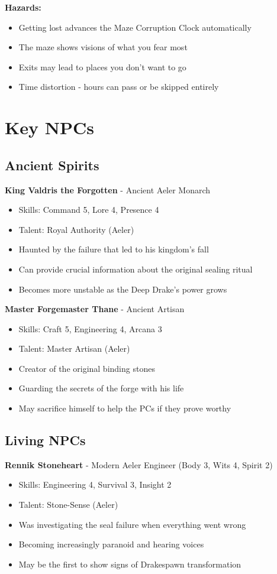 \documentclass[11pt]{article}
\begin{document}
\textbf{Hazards:}
\begin{itemize}
\item Getting lost advances the Maze Corruption Clock automatically
\item The maze shows visions of what you fear most
\item Exits may lead to places you don't want to go
\item Time distortion - hours can pass or be skipped entirely
\end{itemize}

\section{Key NPCs}

\subsection{Ancient Spirits}

\textbf{King Valdris the Forgotten} - Ancient Aeler Monarch
\begin{itemize}
\item Skills: Command 5, Lore 4, Presence 4
\item Talent: Royal Authority (Aeler)
\item Haunted by the failure that led to his kingdom's fall
\item Can provide crucial information about the original sealing ritual
\item Becomes more unstable as the Deep Drake's power grows
\end{itemize}

\textbf{Master Forgemaster Thane} - Ancient Artisan
\begin{itemize}
\item Skills: Craft 5, Engineering 4, Arcana 3
\item Talent: Master Artisan (Aeler)
\item Creator of the original binding stones
\item Guarding the secrets of the forge with his life
\item May sacrifice himself to help the PCs if they prove worthy
\end{itemize}

\subsection{Living NPCs}

\textbf{Rennik Stoneheart} - Modern Aeler Engineer (Body 3, Wits 4, Spirit 2)
\begin{itemize}
\item Skills: Engineering 4, Survival 3, Insight 2
\item Talent: Stone-Sense (Aeler)
\item Was investigating the seal failure when everything went wrong
\item Becoming increasingly paranoid and hearing voices
\item May be the first to show signs of Drakespawn transformation
\end{itemize}
\end{document}
